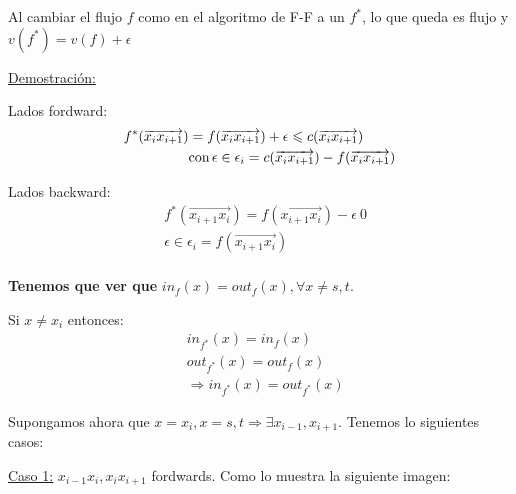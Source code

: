 \documentclass[12pt,a4paper]{article}
\begin{document}
\begin{lema} Al cambiar el flujo $f$ como en el algoritmo de F-F a un $f^{*}$, lo 
    que queda es flujo y $v(f^{*}) = v(f) + \epsilon$
\end{lema}
\underline{Demostración:}
\medskip

Lados fordward:
\begin{align*}
    f^{*}(\overrightarrow{x_{i}x_{i+1}}) &= f(\overrightarrow{x_{i}x_{i+1}}) + \epsilon \leqslant c(\overrightarrow{x_{i}x_{i+1}})\\
    & \text{con}\, \epsilon \in \epsilon_{i} = c(\overrightarrow{x_{i}x_{i+1}}) - f(\overrightarrow{x_{i}x_{i+1}})\\
\end{align*}

Lados backward:
\begin{align*}
    &f^{*}(\overrightarrow{x_{i+1}x_{i}}) = f(\overrightarrow{x_{i+1}x_{i}}) - \epsilon \> 0\\
    &\epsilon \in \epsilon_{i} = f(\overrightarrow{x_{i+1}x_{i}})\\
\end{align*}

\textbf{Tenemos que ver que} $in_{f}(x) = out_{f}(x), \forall x \neq s,t$.
\medskip

Si $x \neq x_{i}$ entonces: 
\begin{align*}
    &in_{f^{*}}(x) = in_{f}(x)\\
    &out_{f^{*}}(x) = out_{f}(x)\\
    &\Rightarrow in_{f^{*}}(x) = out_{f^{*}}(x)
\end{align*}

Supongamos ahora que $x = x_{i}, x=s,t \Rightarrow \exists x_{i-1},x_{i+1}$. Tenemos lo siguientes casos:
\medskip

\underline{Caso 1:} $x_{i-1}x_{i}, x_{i}x_{i+1}$ fordwards. Como lo muestra la siguiente imagen:
\begin{figure}[h!]
    \centering

\end{figure}
\end{document}
